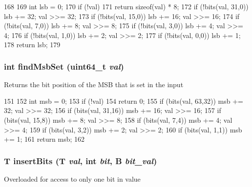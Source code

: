 \begin{DoxyCode}
168                          {
169     int lsb = 0;
170     if (!val)
171         return sizeof(val) * 8;
172     if (!bits(val, 31,0)) { lsb += 32; val >>= 32; }
173     if (!bits(val, 15,0)) { lsb += 16; val >>= 16; }
174     if (!bits(val, 7,0))  { lsb += 8;  val >>= 8;  }
175     if (!bits(val, 3,0))  { lsb += 4;  val >>= 4;  }
176     if (!bits(val, 1,0))  { lsb += 2;  val >>= 2;  }
177     if (!bits(val, 0,0))  { lsb += 1; }
178     return lsb;
179 }
\end{DoxyCode}
\hypertarget{bitfield_8hh_aa8f1ff3b89ba9c337baeef12d161580f}{
\subsubsection[{findMsbSet}]{\setlength{\rightskip}{0pt plus 5cm}int findMsbSet (uint64\_\-t {\em val})}}
\label{bitfield_8hh_aa8f1ff3b89ba9c337baeef12d161580f}
Returns the bit position of the MSB that is set in the input 


\begin{DoxyCode}
151                          {
152     int msb = 0;
153     if (!val)
154         return 0;
155     if (bits(val, 63,32)) { msb += 32; val >>= 32; }
156     if (bits(val, 31,16)) { msb += 16; val >>= 16; }
157     if (bits(val, 15,8))  { msb += 8;  val >>= 8;  }
158     if (bits(val, 7,4))   { msb += 4;  val >>= 4;  }
159     if (bits(val, 3,2))   { msb += 2;  val >>= 2;  }
160     if (bits(val, 1,1))   { msb += 1; }
161     return msb;
162 }
\end{DoxyCode}
\hypertarget{bitfield_8hh_a6b2467118ee42515d4fbaee66ddb72c2}{
\subsubsection[{insertBits}]{\setlength{\rightskip}{0pt plus 5cm}T insertBits (T {\em val}, \/  int {\em bit}, \/  B {\em bit\_\-val})}}
\label{bitfield_8hh_a6b2467118ee42515d4fbaee66ddb72c2}
Overloaded for access to only one bit in value 


